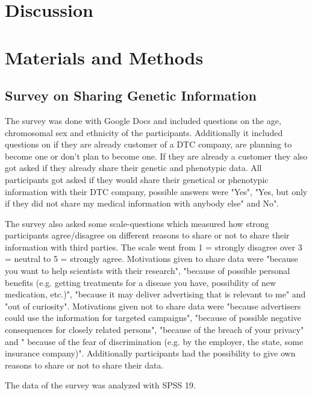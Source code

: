 \documentclass[10pt]{article}
\begin{document}
\section*{Discussion}



\section*{Materials and Methods}
\subsection*{Survey on Sharing Genetic Information}
The survey was done with Google Docs and included questions on the age, chromosomal sex and ethnicity of the participants. Additionally it included questions on if they are already customer of a DTC company, are planning to become one or don't plan to become one. If they are already a customer they also got asked if they already share their genetic and phenotypic data. All participants got asked if they would share their genetical or phenotypic information with their DTC company, possible answers were "Yes", "Yes, but only if they did not share my medical information with anybody else" and No". 

The survey also asked some scale-questions which measured how strong participants agree/disagree on different reasons to share or not to share their information with third parties. The scale went from 1 = strongly disagree over 3 = neutral to  5 = strongly agree. Motivations given to share data were "because you want to help scientists with their research", "because of possible personal benefits (e.g. getting treatments for a disease you have, possibility of new medication, etc.)", "because it may deliver advertising that is relevant to me" and "out of curiosity". Motivations given not to share data were "because advertisers could use the information for targeted campaigns", "because of possible negative consequences for closely related persons", "because of the breach of your privacy" and " because of the fear of discrimination (e.g. by the employer, the state, some insurance company)". Additionally participants had the possibility to give own reasons to share or not to share their data.

The data of the survey was analyzed with SPSS 19. 
\end{document}
